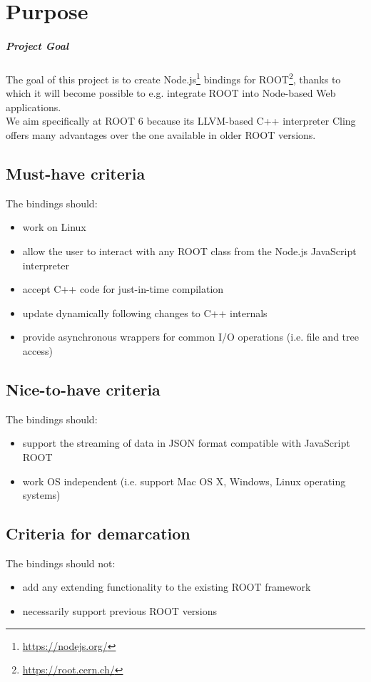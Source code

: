 \chapter{Purpose}
\paragraph{Project Goal}
The goal of this project is to create Node.js\textsuperscript{\textregistered}\footnote{\url{https://nodejs.org/}} bindings for 
ROOT\footnote{\url{https://root.cern.ch/}}, thanks to which it will become possible to e.g. integrate ROOT into Node-based Web applications.\\
We aim specifically at ROOT 6 because its LLVM-based C++ interpreter Cling offers many advantages over the one available in older ROOT versions.
\section{Must-have criteria}
The bindings should:
\begin{itemize}
	\item work on Linux
	\item allow the user to interact with any ROOT class from the Node.js JavaScript interpreter
	\item accept C++ code for just-in-time compilation
	\item update dynamically following changes to C++ internals
	\item provide asynchronous wrappers for common I/O operations (i.e. file and tree access)
\end{itemize}
\pagebreak[3]

\section{Nice-to-have criteria}
The bindings should:
\begin{itemize}
	\item support the streaming of data in JSON format compatible with JavaScript ROOT
	\item work OS independent (i.e. support Mac OS X, Windows, Linux operating systems)
\end{itemize}

\section{Criteria for demarcation}
The bindings should not:
\begin{itemize}
	\item add any extending functionality to the existing ROOT framework
	\item necessarily support previous ROOT versions
\end{itemize}
